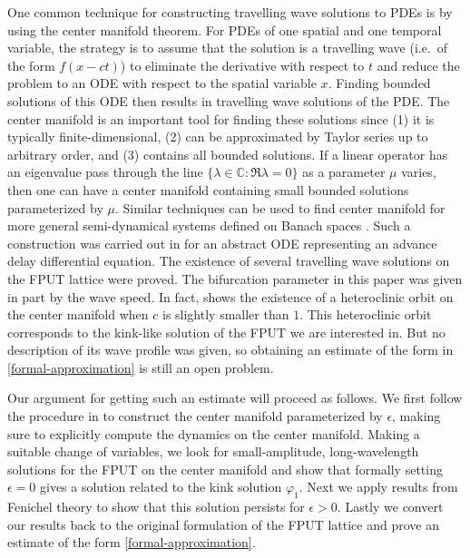 One common technique for constructing travelling wave solutions to PDEs is by using the center manifold theorem. For PDEs of one spatial and one temporal variable, the strategy is to assume that the solution is a travelling wave (i.e.\ of the form \(f(x-ct)\)) to eliminate the derivative with respect to \(t\) and reduce the problem to an ODE with respect to the spatial variable \(x\). Finding bounded solutions of this ODE then results in travelling wave solutions of the PDE. The center manifold is an important tool for finding these solutions since (1) it is typically finite-dimensional, (2) can be approximated by Taylor series up to arbitrary order, and (3) contains all bounded solutions. If a linear operator has an eigenvalue pass through the line \(\{\lambda\in\mathbb C: \Re \lambda = 0\}\) as a parameter \(\mu\) varies, then one can have a center manifold containing small bounded solutions parameterized by \(\mu\). Similar techniques can be used to find center manifold for more general semi-dynamical systems defined on Banach spaces \cite{vanderbauwhede1992center}. Such a construction was carried out in \cite{iooss2000travelling} for an abstract ODE representing an advance delay differential equation. The existence of several travelling wave solutions on the FPUT lattice were proved. The bifurcation parameter in this paper was given in part by the wave speed. In fact, \cite[Thm.\ 5]{iooss2000travelling} shows the existence of a heteroclinic orbit on the center manifold when \(c\) is slightly smaller than \(1\). This heteroclinic orbit corresponds to the kink-like solution of the FPUT we are interested in. But no description of its wave profile was given, so obtaining an estimate of the form in \cref{formal-approximation} is still an open problem.


Our argument for getting such an estimate will proceed as follows. We first follow the procedure in \cite{iooss2000travelling}
to construct the center manifold parameterized by \(\epsilon\), making sure to explicitly compute the dynamics on the center manifold. Making a suitable change of variables, we look for small-amplitude, long-wavelength solutions for the FPUT on the center manifold and show that formally setting \(\epsilon = 0\) gives a solution related to the kink solution \(\varphi_1\). Next we apply results from Fenichel theory to show that this solution persists for \(\epsilon> 0\). Lastly we convert our results back to the original formulation of the FPUT lattice and prove an estimate of the form \cref{formal-approximation}.

